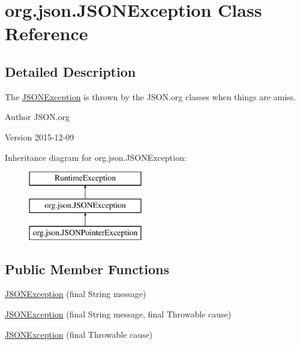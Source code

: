 \hypertarget{classorg_1_1json_1_1JSONException}{\section{org.\-json.\-J\-S\-O\-N\-Exception Class Reference}
\label{classorg_1_1json_1_1JSONException}
}


\subsection{Detailed Description}
The \hyperlink{classorg_1_1json_1_1JSONException}{J\-S\-O\-N\-Exception} is thrown by the J\-S\-O\-N.\-org classes when things are amiss.

\begin{DoxyAuthor}{Author}
J\-S\-O\-N.\-org 
\end{DoxyAuthor}
\begin{DoxyVersion}{Version}
2015-\/12-\/09 
\end{DoxyVersion}
Inheritance diagram for org.\-json.\-J\-S\-O\-N\-Exception\-:\begin{figure}[H]
\begin{center}
\leavevmode
\includegraphics[height=3.000000cm]{classorg_1_1json_1_1JSONException}
\end{center}
\end{figure}
\subsection*{Public Member Functions}
\begin{DoxyCompactItemize}
\item 
\hyperlink{classorg_1_1json_1_1JSONException_a77f0c9e65c7ea12af42cebe7c4901299}{J\-S\-O\-N\-Exception} (final String message)
\item 
\hyperlink{classorg_1_1json_1_1JSONException_a009cb10b2921e438cc34db60f80bc441}{J\-S\-O\-N\-Exception} (final String message, final Throwable cause)
\item 
\hyperlink{classorg_1_1json_1_1JSONException_afec2b0f45f6e11544c0a2e7b23e361a9}{J\-S\-O\-N\-Exception} (final Throwable cause)
\end{DoxyCompactItemize}


